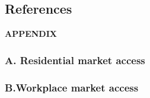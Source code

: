 \documentclass[
  11pt]{article}
\begin{document}
\subsection*{References}\label{references}

\renewcommand{\bibsection}{}


\clearpage

\label{appendix}
\bigskip

\begin{center}

{\large\bf APPENDIX}

\end{center}

\subsubsection*{A. Residential market
access}\label{a.-residential-market-access}



\clearpage

\subsubsection*{B.Workplace market
access}\label{b.workplace-market-access}


\end{document}
